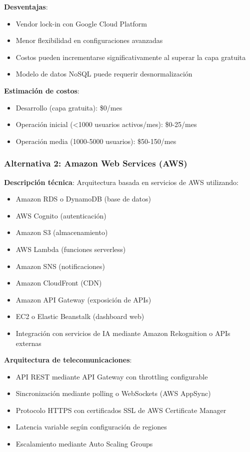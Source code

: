\textbf{Desventajas}:
\begin{itemize}
    \item Vendor lock-in con Google Cloud Platform
    \item Menor flexibilidad en configuraciones avanzadas
    \item Costos pueden incrementarse significativamente al superar la capa gratuita
    \item Modelo de datos NoSQL puede requerir desnormalización
\end{itemize}

\textbf{Estimación de costos}:
\begin{itemize}
    \item Desarrollo (capa gratuita): \$0/mes
    \item Operación inicial (<1000 usuarios activos/mes): \$0-25/mes
    \item Operación media (1000-5000 usuarios): \$50-150/mes
\end{itemize}

\subsubsection{Alternativa 2: Amazon Web Services (AWS)}

\textbf{Descripción técnica}: Arquitectura basada en servicios de AWS utilizando:

\begin{itemize}
    \item Amazon RDS o DynamoDB (base de datos)
    \item AWS Cognito (autenticación)
    \item Amazon S3 (almacenamiento)
    \item AWS Lambda (funciones serverless)
    \item Amazon SNS (notificaciones)
    \item Amazon CloudFront (CDN)
    \item Amazon API Gateway (exposición de APIs)
    \item EC2 o Elastic Beanstalk (dashboard web)
    \item Integración con servicios de IA mediante Amazon Rekognition o APIs externas
\end{itemize}

\textbf{Arquitectura de telecomunicaciones}:
\begin{itemize}
    \item API REST mediante API Gateway con throttling configurable
    \item Sincronización mediante polling o WebSockets (AWS AppSync)
    \item Protocolo HTTPS con certificados SSL de AWS Certificate Manager
    \item Latencia variable según configuración de regiones
    \item Escalamiento mediante Auto Scaling Groups
\end{itemize}

